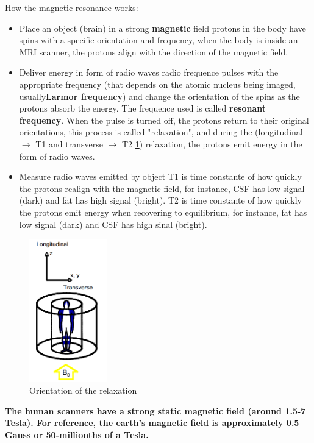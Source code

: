 \documentclass[12pt,article,oneside,a4paper]{memoir}
\begin{document}
How the magnetic resonance works:
\begin{itemize}
\item Place an object (brain) in a strong \textbf{magnetic} field
\subitem protons in the body have spins with a specific orientation and frequency, when the body is inside an MRI scanner, the protons align with the direction of the magnetic field.
\item Deliver energy in form of radio waves
\subitem radio frequence pulses with the appropriate frequency (that depends on the atomic nucleus being imaged, usually\textbf{Larmor frequency}) and change the orientation of the spins as the protons absorb the energy. The frequence used is called \textbf{resonant frequency}. When the pulse is turned off, the protons return to their original orientations, this process is called "relaxation", and during the (longitudinal $\rightarrow$ T1 and transverse $\rightarrow$ T2 \ref{fig:orientation-relaxation}) relaxation, the protons emit energy in the form of radio waves.
\item Measure radio waves emitted by object
\subitem T1 is time constante of how quickly the protons realign with the magnetic field, for instance, CSF has low signal (dark) and fat has high signal (bright).
\subitem T2 is time constante of how quickly the protons emit energy when recovering to equilibrium, for instance, fat has low signal (dark) and CSF has high sinal (bright).
\end{itemize}

\begin{figure}
  \centering
  \includegraphics[width=0.3\textwidth]{imgs/mri-longitudinal-transverse.png}
  \caption{Orientation of the relaxation}
  \label{fig:orientation-relaxation}
\end{figure}

\textbf{The human scanners have a strong static magnetic field (around 1.5-7 Tesla). For reference, the earth's magnetic field is approximately 0.5 Gauss or 50-millionths of a Tesla.}
\end{document}
